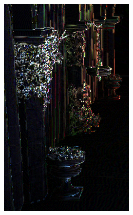 \begin{figure}[htb]
\begin{subfigure}[b]{0.20\textwidth}
        \includegraphics[width=.95\textwidth]{screenshots/interleaved_difference_gi}%
        \caption{}
        \label{fig:results:interleaved_difference_gi}%
    \end{subfigure}\\
    \par\medskip
    \begin{subfigure}[b]{0.333\textwidth}
        \centering

\end{subfigure}
\end{figure}
